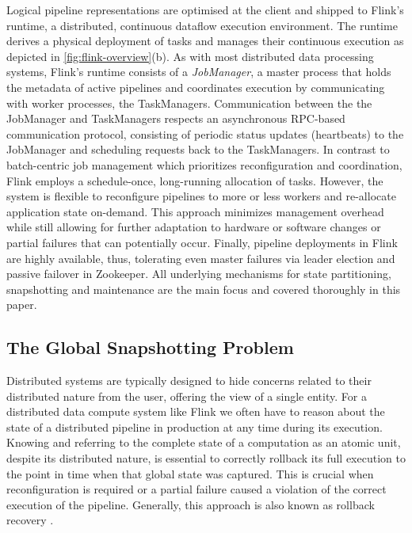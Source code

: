 Logical pipeline representations are optimised at the client and shipped to Flink's runtime, a distributed, continuous dataflow execution environment. The runtime derives a physical deployment of tasks and manages their continuous execution as depicted in \autoref{fig:flink-overview}(b). As with most distributed data processing systems, Flink's runtime consists of a \emph{JobManager}, a master process that holds the metadata of active pipelines and coordinates execution by communicating with worker processes, the TaskManagers. Communication between the the JobManager and TaskManagers respects an asynchronous RPC-based communication protocol, consisting of periodic status updates (heartbeats) to the JobManager and scheduling requests back to the TaskManagers. In contrast to batch-centric job management \cite{zaharia2012discretized} which prioritizes reconfiguration and coordination, Flink employs a schedule-once, long-running allocation of tasks. However, the system is flexible to reconfigure pipelines to more or less workers and re-allocate application state on-demand. This approach minimizes management overhead while still allowing for further adaptation to hardware or software changes or partial failures that can potentially occur. Finally, pipeline deployments in Flink are highly available, thus, tolerating even master failures via leader election and passive failover in Zookeeper. All underlying mechanisms for state partitioning, snapshotting and maintenance are the main focus and covered thoroughly in this paper.


\subsection{The Global Snapshotting Problem}

Distributed systems are typically designed to hide concerns related to their distributed nature from the user, offering the view of a single entity. For a distributed data compute system like Flink we often have to reason about the state of a distributed pipeline in production at any time during its execution. Knowing and referring to the complete state of a computation as an atomic unit, despite its distributed nature, is essential to correctly rollback its full execution to the point in time when that global state was captured. This is crucial when reconfiguration is required or a partial failure caused a violation of the correct execution of the pipeline. Generally, this approach is also known as rollback recovery \cite{elnozahy2002survey}. 

